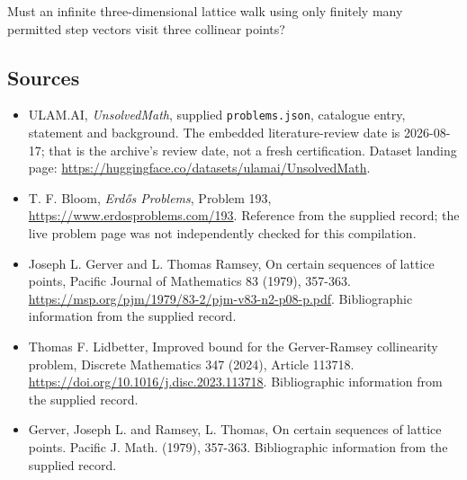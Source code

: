 \documentclass[11pt,a4paper]{article}
\begin{document}
Must an infinite three-dimensional lattice walk using only finitely many permitted step vectors visit three collinear points?

\subsection{Sources}

{\small

\begin{itemize}

\item[\hypertarget{source:statement:1}{S1}] ULAM.AI, \emph{UnsolvedMath}, supplied \texttt{problems.json}, catalogue entry, statement and background. The embedded literature-review date is 2026-08-17; that is the archive’s review date, not a fresh certification. Dataset landing page: \url{https://huggingface.co/datasets/ulamai/UnsolvedMath}.

\item[\hypertarget{source:statement:2}{S2}] T. F. Bloom, \emph{Erdős Problems}, Problem 193, \url{https://www.erdosproblems.com/193}. Reference from the supplied record; the live problem page was not independently checked for this compilation.

\item[\hypertarget{source:statement:3}{S3}] Joseph L. Gerver and L. Thomas Ramsey, On certain sequences of lattice points, Pacific Journal of Mathematics 83 (1979), 357-363. \url{https://msp.org/pjm/1979/83-2/pjm-v83-n2-p08-p.pdf}. Bibliographic information from the supplied record.

\item[\hypertarget{source:statement:4}{S4}] Thomas F. Lidbetter, Improved bound for the Gerver-Ramsey collinearity problem, Discrete Mathematics 347 (2024), Article 113718. \url{https://doi.org/10.1016/j.disc.2023.113718}. Bibliographic information from the supplied record.

\item[\hypertarget{source:statement:5}{S5}] Gerver, Joseph L. and Ramsey, L. Thomas, On certain sequences of lattice points. Pacific J. Math. (1979), 357-363. Bibliographic information from the supplied record.

\end{itemize}

}

\label{end:statement}
\end{document}
